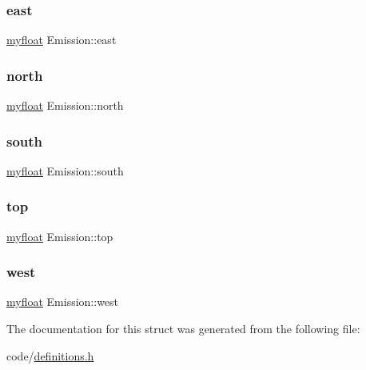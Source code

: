 \subsubsection{\texorpdfstring{east}{east}}
{\footnotesize\ttfamily \hyperlink{param_8h_a5f097c9f3873af7be7fc156e6a06ca5e}{myfloat} Emission\+::east}

\mbox{\label{structEmission_ab9db4a509a3f5d30caa56623f42397c4}} 
\subsubsection{\texorpdfstring{north}{north}}
{\footnotesize\ttfamily \hyperlink{param_8h_a5f097c9f3873af7be7fc156e6a06ca5e}{myfloat} Emission\+::north}

\mbox{\label{structEmission_a8bc796f7f0d26bc1ad7342c9cf46b7ae}} 
\subsubsection{\texorpdfstring{south}{south}}
{\footnotesize\ttfamily \hyperlink{param_8h_a5f097c9f3873af7be7fc156e6a06ca5e}{myfloat} Emission\+::south}

\mbox{\label{structEmission_a6efd76af6756040d8e12b003598356df}} 
\subsubsection{\texorpdfstring{top}{top}}
{\footnotesize\ttfamily \hyperlink{param_8h_a5f097c9f3873af7be7fc156e6a06ca5e}{myfloat} Emission\+::top}

\mbox{\label{structEmission_a900bfa3e3e13b3a85d3fbe1c3c2e8263}} 
\subsubsection{\texorpdfstring{west}{west}}
{\footnotesize\ttfamily \hyperlink{param_8h_a5f097c9f3873af7be7fc156e6a06ca5e}{myfloat} Emission\+::west}



The documentation for this struct was generated from the following file\+:\begin{DoxyCompactItemize}
\item 
code/\hyperlink{definitions_8h}{definitions.\+h}\end{DoxyCompactItemize}
